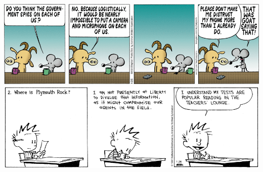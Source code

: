 \documentclass[landscape]{article}
\begin{document}
\begin{multicols}{3}
\renewcommand*\sudokuformat[1]{\sffamily#1}
\setlength\sudokusize{\linewidth}
\setlength\sudokuthickline{1pt}
\begin{center}
	
\end{center}

\center\includegraphics[width=\linewidth]{images/comic-pearls.png}
\center\includegraphics[width=\linewidth]{images/comic-calvinandhobbes.png}

\end{multicols}
\end{document}
